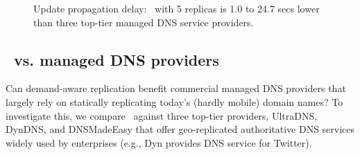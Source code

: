 \begin{figure}[ht]
\begin{minipage}[b]{0.48\linewidth}
\figvsp
\caption{Update propagation delay: \auspice\ with 5 replicas is  1.0 to 24.7 secs lower than three top-tier managed DNS service providers. }
\label{fig:manageddnsupdate}
\end{minipage}
\vspace{-0.25in}
\end{figure}
 
 
\vsp
\subsection{\auspice\ vs. managed DNS providers}
\label{sec:managed}
 

Can demand-aware replication benefit commercial managed DNS providers that largely rely on statically replicating today's (hardly mobile) domain names? To investigate this, we compare \auspice\ against three top-tier providers, UltraDNS, DynDNS, and DNSMadeEasy %
that offer geo-replicated authoritative DNS services widely used by enterprises (e.g., Dyn provides DNS service for Twitter).




